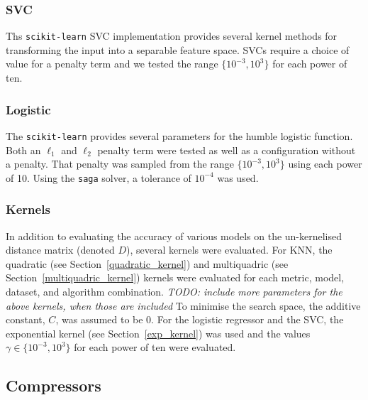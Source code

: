 \documentclass[preprint,12pt]{elsarticle}
\newcommand{\cm}[1]{\textit{{\color{blue}#1}}}
\begin{document}
\subsubsection{SVC}

Ths \texttt{scikit-learn} SVC implementation provides several kernel methods for transforming the input into a separable feature space.
SVCs require a choice of value for a penalty term and we tested the range $\{ 10^{-3}, 10^3 \}$ for each power of ten.



\subsubsection{Logistic}

The \texttt{scikit-learn} provides several parameters for the humble logistic function.
Both an $\ell_1$ and $\ell_2$ penalty term were tested as well as a configuration without a penalty. That penalty was sampled from the range $\{10^{-3}, 10^3\}$ using each power of 10.
Using the \texttt{saga} solver, a tolerance of $10^{-4}$ was used.

\subsubsection{Kernels}

In addition to evaluating the accuracy of various models on the un-kernelised distance matrix (denoted $D$), several kernels were evaluated.
For KNN, the quadratic (see Section~\ref{quadratic_kernel}) and multiquadric (see Section~\ref{multiquadric_kernel}) kernels were evaluated for each metric, model, dataset, and algorithm combination.
\cm{TODO: include more parameters for the above kernels, when those are included}
To minimise the search space, the additive constant, $C$, was assumed to be 0.
For the logistic regressor and the SVC, the exponential kernel (see Section~\ref{exp_kernel}) was used and the values $\gamma \in \{10^{-3}, 10^3\}$ for each power of ten were evaluated.



\subsection{Compressors}
\label{compressors}
\end{document}

